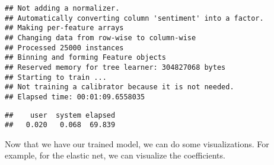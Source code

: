 \documentclass[]{book}
\theoremstyle{definition}
\theoremstyle{definition}
\theoremstyle{definition}
\theoremstyle{remark}
\begin{document}
\begin{verbatim}
## Not adding a normalizer.
## Automatically converting column 'sentiment' into a factor.
## Making per-feature arrays
## Changing data from row-wise to column-wise
## Processed 25000 instances
## Binning and forming Feature objects
## Reserved memory for tree learner: 304827068 bytes
## Starting to train ...
## Not training a calibrator because it is not needed.
## Elapsed time: 00:01:09.6558035
\end{verbatim}

\begin{verbatim}
##    user  system elapsed 
##   0.020   0.068  69.839
\end{verbatim}

Now that we have our trained model, we can do some visualizations. For
example, for the elastic net, we can visualize the coefficients.
\end{document}
